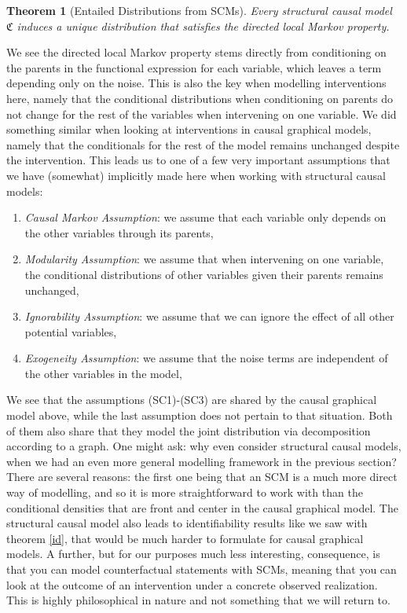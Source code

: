 \documentclass[11pt, a4paper]{memoir}
\theoremstyle{break}
\newtheorem{thm}{Theorem}
\theoremstyle{break}
\theoremstyle{nonumberplain}
\begin{document}
\begin{thm}[Entailed Distributions from SCMs]\label{entail}
Every structural causal model $\mathfrak{C}$ induces a unique distribution that satisfies the directed local Markov property.
\end{thm}
We see the directed local Markov property stems directly from conditioning on the parents in the functional expression for each variable, which leaves a term depending only on the noise. This is also the key when modelling interventions here, namely that the conditional distributions when conditioning on parents do not change for the rest of the variables when intervening on one variable. We did something similar when looking at interventions in causal graphical models, namely that the conditionals for the rest of the model remains unchanged despite the intervention. This leads us to one of a few very important assumptions that we have (somewhat) implicitly made here when working with structural causal models:
\begin{enumerate}[itemindent=15pt,label=(SC\arabic*)]
	\item \emph{Causal Markov Assumption}: we assume that each variable only depends on the other variables through its parents,
	\item \emph{Modularity Assumption}: we assume that when intervening on one variable, the conditional distributions of other variables given their parents remains unchanged,
	\item \emph{Ignorability Assumption}: we assume that we can ignore the effect of all other potential variables,
	\item \emph{Exogeneity Assumption}: we assume that the noise terms are independent of the other variables in the model,
\end{enumerate}
We see that the assumptions (SC1)-(SC3) are shared by the causal graphical model above, while the last assumption does not pertain to that situation. Both of them also share that they model the joint distribution via decomposition according to a graph. One might ask: why even consider structural causal models, when we had an even more general modelling framework in the previous section? There are several reasons: the first one being that an SCM is a much more direct way of modelling, and so it is more straightforward to work with than the conditional densities that are front and center in the causal graphical model. The structural causal model also leads to identifiability results like we saw with theorem \ref{id}, that would be much harder to formulate for causal graphical models. A further, but for our purposes much less interesting, consequence, is that you can model counterfactual statements with SCMs, meaning that you can look at the outcome of an intervention under a concrete observed realization. This is highly philosophical in nature and not something that we will return to.\\\\
\end{document}
